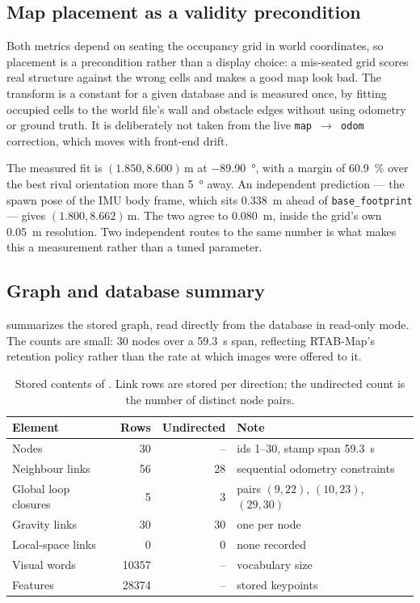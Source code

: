 \subsection{Map placement as a validity precondition}
\label{sec:map-placement}

Both metrics depend on seating the occupancy grid in world coordinates, so
placement is a precondition rather than a display choice: a mis-seated grid
scores real structure against the wrong cells and makes a good map look bad. The
transform is a constant for a given database and is measured once, by fitting
occupied cells to the world file's wall and obstacle edges without using odometry
or ground truth. It is deliberately not taken from the live
\texttt{map~$\rightarrow$~odom} correction, which moves with front-end drift.

The measured fit is $(1.850, 8.600)\,\si{\metre}$ at \SI{-89.90}{\degree}, with a
margin of \SI{60.9}{\percent} over the best rival orientation more than
\SI{5}{\degree} away. An independent prediction --- the spawn pose of the IMU body
frame, which sits \SI{0.338}{\metre} ahead of \texttt{base\_footprint} --- gives
$(1.800, 8.662)\,\si{\metre}$. The two agree to \SI{0.080}{\metre}, inside the
grid's own \SI{0.05}{\metre} resolution. Two independent routes to the same
number is what makes this a measurement rather than a tuned parameter.

\subsection{Graph and database summary}

 summarizes the stored graph, read directly from the database
in read-only mode. The counts are small: \num{30} nodes over a \SI{59.3}{\second}
span, reflecting RTAB-Map's retention policy rather than the rate at which images
were offered to it.

\begin{table}[htbp]
\centering
\caption{Stored contents of . Link rows are stored per
direction; the undirected count is the number of distinct node pairs.}
\label{tab:map-graph}
\small
\begin{tabularx}{\textwidth}{>{\raggedright\arraybackslash}p{}rr>{\raggedright\arraybackslash}X}
\toprule
Element & Rows & Undirected & Note \\
\midrule
Nodes & 30 & -- & ids 1--30, stamp span \SI{59.3}{\second} \\
Neighbour links & 56 & 28 & sequential odometry constraints \\
Global loop closures & 5 & 3 & pairs $(9,22)$, $(10,23)$, $(29,30)$ \\
Gravity links & 30 & 30 & one per node \\
Local-space links & 0 & 0 & none recorded \\
Visual words & \num{10357} & -- & vocabulary size \\
Features & \num{28374} & -- & stored keypoints \\
\bottomrule
\end{tabularx}
\end{table}

